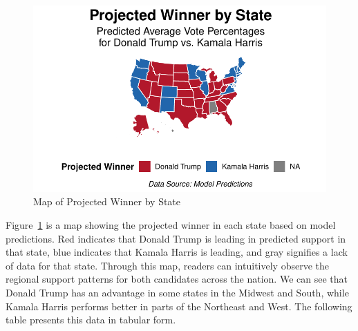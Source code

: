 \documentclass[
  letterpaper,
  DIV=11,
  numbers=noendperiod]{scrartcl}
\begin{document}
\begin{figure}

{\centering \includegraphics{Insights-and-Predictions-for-the-U.S.-Election_files/figure-pdf/fig-map-1.pdf}

}

\caption{\label{fig-map}Map of Projected Winner by State}

\end{figure}

Figure~\ref{fig-map} is a map showing the projected winner in each state
based on model predictions. Red indicates that Donald Trump is leading
in predicted support in that state, blue indicates that Kamala Harris is
leading, and gray signifies a lack of data for that state. Through this
map, readers can intuitively observe the regional support patterns for
both candidates across the nation. We can see that Donald Trump has an
advantage in some states in the Midwest and South, while Kamala Harris
performs better in parts of the Northeast and West. The following table
presents this data in tabular form.
\end{document}
